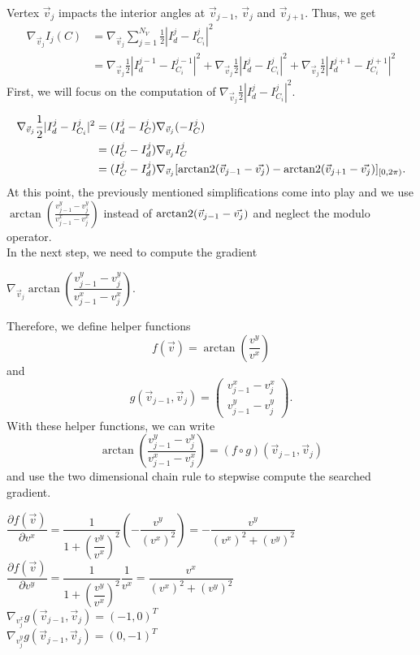 \begin{proposition}
	Vertex $\vec{v}_j$ impacts the interior angles at $\vec{v}_{j-1}$, $\vec{v}_j$ and $\vec{v}_{j+1}$. 
	Thus, we get 
	\begin{align*}
		\nabla_{\vec{v}_j}  I_{j}(C) &=  \nabla_{\vec{v}_j} \sum\limits_{j=1}^{N_V} \frac{1}{2}| I^{j}_d - I^j_{C_i} |^2 \\
		&= \nabla_{\vec{v}_j} \frac{1}{2}| I^{j-1}_d - I^{j-1}_{C_i} |^2 
		+ \nabla_{\vec{v}_j} \frac{1}{2}| I^{j}_d - I^{j}_{C_i} |^2 
		+ \nabla_{\vec{v}_j} \frac{1}{2}| I^{j+1}_d - I^{j+1}_{C_i} |^2
	\end{align*}
	First, we will focus on the computation of $\nabla_{\vec{v}_j} \frac{1}{2}| I^{j}_d - I^{j}_{C_i} |^2$. 

	\begin{align*}
		\nabla_{\vec{v}_j} \frac{1}{2}| I^{j}_d - I^{j}_{C_i} |^2 
		&= (I^{j}_d - I^j_{C}) \nabla_{\vec{v}_j} (- I^j_{C})\\
		&= (I^j_{C} - I^{j}_d) \nabla_{\vec{v}_j}  I^j_{C}   \\
		&= (I^j_{C} - I^{j}_d) \nabla_{\vec{v}_j} [\operatorname{arctan2}(\vec{v}_{j-1} - \vec{v_j}) - \operatorname{arctan2}(\vec{v}_{j+1} - \vec{v_j})]_{[0,2\pi)}.
	\end{align*}
	At this point, the previously mentioned simplifications come into play and we use $\arctan\! \left(\frac{v_{j-1}^{y} - v_{j}^{y}}{v_{j-1}^{x} - v_{j}^{x}} \right)$ instead of $\operatorname{arctan2}(\vec{v}_{j-1} - \vec{v_j})$ and neglect the modulo operator. \\
	In the next step, we need to compute the gradient 
	\begin{center}
		$
		\nabla_{\vec{v}_j} \arctan\! \left(\dfrac{v_{j-1}^{y} - v_{j}^{y}}{v_{j-1}^{x} - v_{j}^{x}} \right).
		$
	\end{center}
	
	Therefore, we define helper functions 
	$$ f(\vec{v}) = \arctan\!\left( \frac{v^{y}}{v^{x}} \right)$$ 
	and 
	$$g(\vec{v}_{j-1}, \vec{v}_{j}) = \begin{pmatrix}
		v_{j-1}^{x} - v_{j}^{x} \\[0.5em] 
		v_{j-1}^{y} - v_{j}^{y}
	\end{pmatrix}.$$
	With these helper functions, we can write 
	$$ \arctan\!\left(\frac{v_{j-1}^{y} - v_{j}^{y}}{v_{j-1}^{x} - v_{j}^{x}}\right) = (f \circ g) (\vec{v}_{j-1}, \vec{v}_{j}) $$
	and use the two dimensional chain rule to stepwise compute the searched gradient. 
 
	\begin{center}
		
		$\dfrac{\partial f(\vec{v})}{\partial v^{x}} = \dfrac{1}{1 + \left(\dfrac{v^{y}}{v^{x}}\right)^2} \left(- \dfrac{v^{y}}{(v^{x})^2}\right) = - \dfrac{v^{y}}{(v^{x})^2 + (v^{y})^2}$ \\
		$\dfrac{\partial f(\vec{v})}{\partial v^{y}} = \dfrac{1}{1 + \left(\dfrac{v^{y}}{v^{x}}\right)^2}  \dfrac{1}{v^{x}} =  \dfrac{v^{x}}{(v^{x})^2 + (v^{y})^2}$ \\ [0.5em]
		$ \nabla_{v_j^{x}} g(\vec{v}_{j-1}, \vec{v}_{j}) = (-1, 0)^T$ \\
		$ \nabla_{v_j^{y}} g(\vec{v}_{j-1}, \vec{v}_{j}) = (0, -1)^T$ 
	

\end{center}
\end{proposition}
